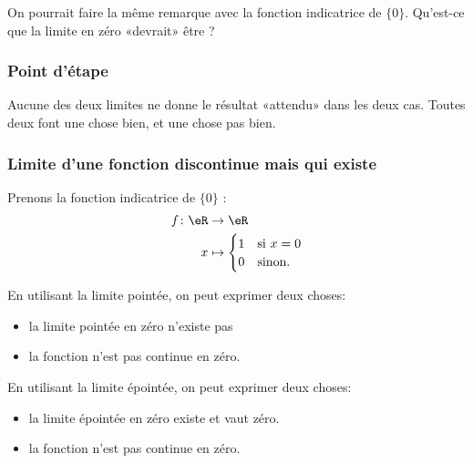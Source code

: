 On pourrait faire la même remarque avec la fonction indicatrice de \( \{ 0 \}\). Qu'est-ce que la limite en zéro «devrait» être ?

\subsubsection{Point d'étape}

Aucune des deux limites ne donne le résultat «attendu» dans les deux cas. Toutes deux font une chose bien, et une chose pas bien.

\subsubsection{Limite d'une fonction discontinue mais qui existe}

Prenons la fonction indicatrice de \( \{ 0 \}\) :
\begin{equation}
	\begin{aligned}
		f\colon\eR & \to \eR                            \\
		x          & \mapsto \begin{cases}
			1 & \text{si } x=0 \\
			0 & \text{sinon. }
		\end{cases}
	\end{aligned}
\end{equation}

En utilisant la limite pointée, on peut exprimer deux choses:
\begin{itemize}
	\item la limite pointée en zéro n'existe pas
	\item la fonction n'est pas continue en zéro.
\end{itemize}

En utilisant la limite épointée, on peut exprimer deux choses:
\begin{itemize}
	\item la limite épointée en zéro existe et vaut zéro.
	\item la fonction n'est pas continue en zéro.
\end{itemize}


